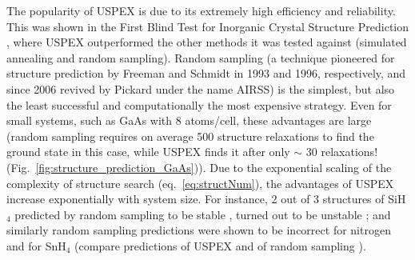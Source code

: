 \documentclass[12pt]{article}
\begin{document}
The popularity of USPEX is due to its extremely high efficiency and reliability.
This was shown in the First Blind Test for Inorganic Crystal Structure
Prediction \cite{Oganov-book2010a}, where USPEX outperformed the other methods
it was tested against (simulated annealing and random sampling). Random sampling
(a technique pioneered for structure prediction by Freeman and Schmidt in 1993
and 1996, respectively, and since 2006 revived by Pickard \cite{Pickard2006}
under the name AIRSS) is the simplest, but also the least successful and
computationally the most expensive strategy. Even for small systems, such as
GaAs with 8 atoms/cell, these advantages are large (random sampling requires on
average 500 structure relaxations to find the ground state in this case, while
USPEX finds it after only $\sim$ 30 relaxations!
(Fig.~\ref{fig:structure_prediction_GaAs})). Due to the exponential scaling of
the complexity of structure search (eq.~\ref{eq:structNum}), the advantages of
USPEX increase exponentially with system size. For instance, 2 out of 3
structures of SiH$_4$ predicted by random sampling to be stable
\cite{Pickard2006}, turned out to be unstable \cite{Martinez-Canales2009}; and
similarly random sampling predictions were shown \cite{Ma2009} to be incorrect
for nitrogen \cite{Pickard2009a} and for SnH$_4$ (compare predictions
\cite{Gao2010} of USPEX and of random sampling \cite{Pickard2009b}).
\end{document}
